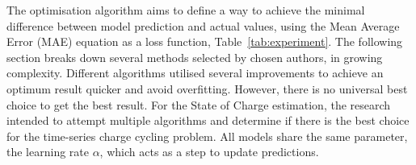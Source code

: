 The optimisation algorithm aims to define a way to achieve the minimal difference between model prediction and actual values, using the Mean Average Error (MAE) equation as a loss function, \mbox{Table~\ref{tab:experiment}}.
The following section breaks down several methods selected by chosen authors, in growing complexity.
Different algorithms utilised several improvements to achieve an optimum result quicker and avoid overfitting.
However, there is no universal best choice to get the best result.
For the State of Charge estimation, the research intended to attempt multiple algorithms and determine if there is the best choice for the time-series charge cycling problem.
All models share the same parameter, the learning rate $\alpha$, which acts as a step to update predictions.

